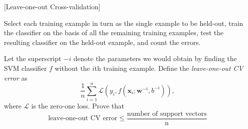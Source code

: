 \item {} [Leave-one-out Cross-validation]

Select each training example in turn as the single example to be held-out, train the classifier on the basis of all the remaining training examples, test the resulting classifier on the held-out example, and count the errors.

Let the superscript $-i$ denote the parameters we would obtain by finding the SVM classifier $f$ without the $i$th training example. Define the \textit{leave-one-out CV error} as
\begin{equation}
    \frac{1}{n}\sum_{i=1}^n\mathcal{L}(y_i,f(\mathbf{x}_i;\mathbf{w}^{-i},b^{-i})),
\end{equation}
where $\mathcal{L}$ is the zero-one loss. Prove that
\begin{equation}
    \text{leave-one-out CV error}\leq \frac{\text{number of support vectors}}{\text{n}}
\end{equation}

\solution












\newpage